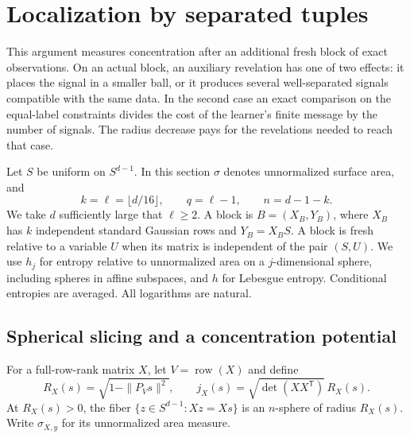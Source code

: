 \section{Localization by separated tuples}
\label{l:sep:section}

This argument measures concentration after an additional fresh block
of exact observations.  On an actual block, an auxiliary revelation
has one of two effects: it places the signal in a smaller ball, or
it produces several well-separated signals compatible with the same
data.  In the second case an exact comparison on the equal-label
constraints divides the cost of the learner's finite message by the
number of signals.  The radius decrease pays for the revelations
needed to reach that case.

Let \(S\) be uniform on \(S^{d-1}\).  In this section \(\sigma\)
denotes unnormalized surface area, and
\[
 k=\ell=\lfloor d/16\rfloor,\qquad q=\ell-1,\qquad n=d-1-k.
\]
We take \(d\) sufficiently large that \(\ell\ge2\).  A block is
\(B=(X_B,Y_B)\), where \(X_B\) has \(k\) independent standard
Gaussian rows and \(Y_B=X_BS\).  A block is fresh relative to a
variable \(U\) when its matrix is independent of the pair \((S,U)\).
We use \(h_j\) for entropy relative to unnormalized area
on a \(j\)-dimensional sphere, including spheres in affine subspaces,
and \(h\) for Lebesgue entropy.  Conditional entropies are averaged.
All logarithms are natural.

\subsection{Spherical slicing and a concentration potential}

For a full-row-rank matrix \(X\), let \(V=\operatorname{row}(X)\) and
define
\[
 R_X(s)=\sqrt{1-\|P_Vs\|^2},\qquad
 j_X(s)=\sqrt{\det(XX^{\mathsf T})}\,R_X(s).
\]
At \(R_X(s)>0\), the fiber \(\{z\in S^{d-1}:Xz=Xs\}\) is an
\(n\)-sphere of radius \(R_X(s)\).  Write \(\sigma_{X,y}\) for its
unnormalized area measure.


